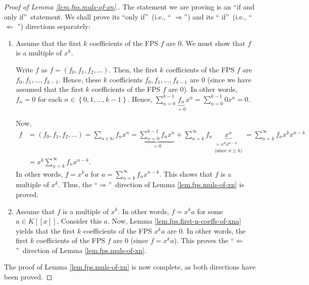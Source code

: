 \begin{proof}
[Proof of Lemma \ref{lem.fps.muls-of-xn}.]The statement we are proving is an
\textquotedblleft if and only if\textquotedblright\ statement. We shall prove
its \textquotedblleft only if\textquotedblright\ (i.e., \textquotedblleft%
$\Longrightarrow$\textquotedblright) and its \textquotedblleft
if\textquotedblright\ (i.e., \textquotedblleft$\Longleftarrow$%
\textquotedblright) directions separately:

\begin{enumerate}
\item[$\Longrightarrow:$] Assume that the first $k$ coefficients of the FPS
$f$ are $0$. We must show that $f$ is a multiple of $x^{k}$.

Write $f$ as $f=\left(  f_{0},f_{1},f_{2},\ldots\right)  $. Then, the first
$k$ coefficients of the FPS $f$ are $f_{0},f_{1},\ldots,f_{k-1}$. Hence, these
$k$ coefficients $f_{0},f_{1},\ldots,f_{k-1}$ are $0$ (since we have assumed
that the first $k$ coefficients of the FPS $f$ are $0$). In other words,
$f_{n}=0$ for each $n\in\left\{  0,1,\ldots,k-1\right\}  $. Hence, $\sum
_{n=0}^{k-1}\underbrace{f_{n}}_{=0}x^{n}=\sum_{n=0}^{k-1}0x^{n}=0$.

Now,
\begin{align*}
f  &  =\left(  f_{0},f_{1},f_{2},\ldots\right)  =\sum_{n\in\mathbb{N}}%
f_{n}x^{n}=\underbrace{\sum_{n=0}^{k-1}f_{n}x^{n}}_{=0}+\sum_{n=k}^{\infty
}f_{n}\underbrace{x^{n}}_{\substack{=x^{k}x^{n-k}\\\text{(since }n\geq
k\text{)}}}=\sum_{n=k}^{\infty}f_{n}x^{k}x^{n-k}\\
&  =x^{k}\sum_{n=k}^{\infty}f_{n}x^{n-k}.
\end{align*}
In other words, $f=x^{k}a$ for $a=\sum_{n=k}^{\infty}f_{n}x^{n-k}$. This shows
that $f$ is a multiple of $x^{k}$. Thus, the \textquotedblleft$\Longrightarrow
$\textquotedblright\ direction of Lemma \ref{lem.fps.muls-of-xn} is proved.

\item[$\Longleftarrow:$] Assume that $f$ is a multiple of $x^{k}$. In other
words, $f=x^{k}a$ for some $a\in K\left[  \left[  x\right]  \right]  $.
Consider this $a$. Now, Lemma \ref{lem.fps.first-n-coeffs-of-xna} yields that
the first $k$ coefficients of the FPS $x^{k}a$ are $0$. In other words, the
first $k$ coefficients of the FPS $f$ are $0$ (since $f=x^{k}a$). This proves
the \textquotedblleft$\Longleftarrow$\textquotedblright\ direction of Lemma
\ref{lem.fps.muls-of-xn}.
\end{enumerate}

The proof of Lemma \ref{lem.fps.muls-of-xn} is now complete, as both
directions have been proved.
\end{proof}

